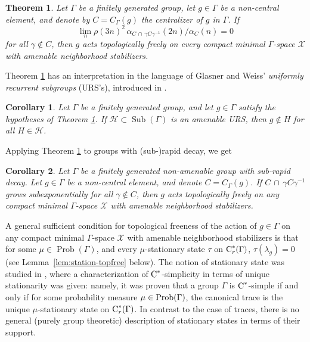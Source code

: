 \documentclass[12pt]{amsart}
\newtheorem{theo}{Theorem}
\newtheorem{coro}{Corollary}
\theoremstyle{definition}
\theoremstyle{remark}
\newcommand{\pr}{\operatorname{Prob}}
\newcommand{\g}{\gamma}
\newcommand{\Sub}{\operatorname{Sub}}
\newcommand{\G}{\Gamma}
\begin{document}
\begin{theo}\label{thm:freeness}
Let $\G$ be a finitely generated group, let $g\in\Gamma$ be a non-central element, and denote by $C=C_\G(g)$ the centralizer of $g$ in $\G$. If 
\begin{equation}\label{eqn}
\lim_n\rho(3n)^2\,\alpha_{\scriptscriptstyle C\,\cap\, \g C\g^{-1}}(2n) /\alpha_{\scriptscriptstyle C}(n) = 0 \tag{$\star$}
\end{equation}
for all $\g\notin C$,
then $g$ acts topologically freely on every compact minimal $\Gamma$-space $\mathcal{X}$ with amenable neighborhood stabilizers.
\end{theo}

Theorem \ref{thm:freeness} has an interpretation in the language of Glasner and Weiss' \textit{uniformly recurrent subgroups} (URS's), introduced in \cite{gw_urs}.

\begin{coro}\label{urs}
Let $\Gamma$ be a finitely generated group, and let $g\in\Gamma$ satisfy the hypotheses of Theorem \ref{thm:freeness}. If $\mathcal{H}\subset \Sub(\Gamma)$ is an amenable URS, then $g\not\in H$ for all $H\in\mathcal{H}$.
\end{coro}

Applying Theorem \ref{thm:freeness} to groups with (sub-)rapid decay, we get

\begin{coro}\label{cor:srd}
Let $\G$ be a finitely generated non-amenable group with sub-rapid decay. Let $g\in\G$ be a non-central element, and denote $C=C_\G(g)$. 
If $C\,\cap\, \g C\g^{-1}$ grows subexponentially for all $\g\notin C$,
then $g$ acts topologically freely on any compact minimal $\G$-space $\mathcal{X}$ with amenable neighborhood stabilizers.
\end{coro}


\medskip


A general sufficient condition for topological freeness of the action of $g\in\G$ on any compact minimal $\Gamma$-space $\mathcal{X}$ with amenable neighborhood stabilizers is that for some $\mu\in \pr(\G)$, and every $\mu$-stationary state $\tau$ on $\textup{C}^*_r(\G)$, $\tau(\lambda_g)=0$ (see Lemma~\ref{lem:station-topfree} below). The notion of stationary state was studied in \cite{hart-kalantar-1}, where a
characterization of $\textup{C}^*$-simplicity in terms of unique stationarity was given: namely, it was proven that a group $\G$ is $\textup{C}^*$-simple if and only if for some probability measure $\mu\in {\rm Prob}(\G)$, the canonical trace is the unique $\mu$-stationary state on $\textup{C}^*_r(\G)$. In contrast to the case of traces, there is no general (purely group theoretic) description of stationary states in terms of their support.
\end{document}
